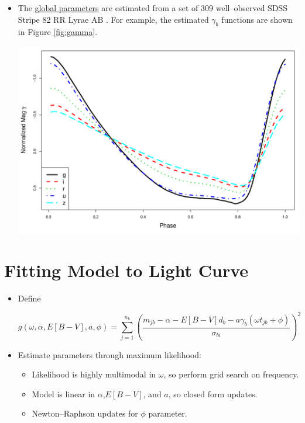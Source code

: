 \documentclass[a0,portrait]{a0poster}
\begin{document}
\begin{multicols}{2}
\begin{itemize}
\item The \underline{global parameters} are estimated from a set of 309 well--observed SDSS Stripe 82 RR Lyrae AB \cite{sesar2010light}. For example, the estimated $\gamma_b$ functions are shown in Figure \ref{fig:gamma}.

\begin{center}\vspace{1cm}
\includegraphics[width=0.7\linewidth]{templates.pdf}
\end{center}\vspace{1cm}


\end{itemize}


\section*{Fitting Model to Light Curve}

\begin{itemize}

\item Define

\begin{equation*}
g(\omega,\alpha,E[B-V],a,\phi) = \sum_{j=1}^{n_b}\left(\frac{m_{jb} - \alpha - E[B-V]d_b - a\gamma_b(\omega t_{jb} + \phi)}{\sigma_{bi}}\right)^2
\end{equation*}

\item Estimate parameters through maximum likelihood:
\begin{itemize}
\item Likelihood is highly multimodal in $\omega$, so perform grid search on frequency.
\item Model is linear in $\alpha$,$E[B-V]$, and $a$, so closed form updates.
\item Newton--Raphson updates for $\phi$ parameter.
\end{itemize}


\end{itemize}
\end{multicols}
\end{document}
